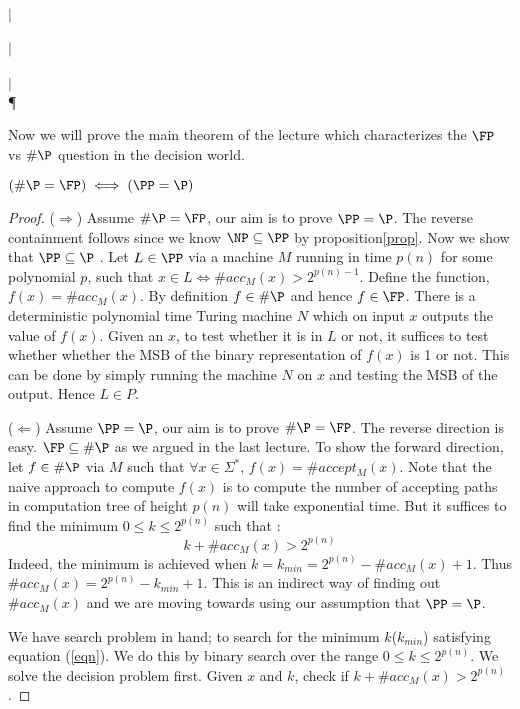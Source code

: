 \begin{center}
\PSPACE \\ 
$\vert$ \\
\PP \\
$\vert$ \\
\NP \\
$\vert$ \\
\P
\end{center}

Now we will prove the main theorem of the lecture which characterizes the $\FP$ vs $\#\P$ question in the decision world.

\begin{theorem}
 $(\#\P = \FP) \iff (\PP = \P)$
\end{theorem}
\begin{proof}
($\Rightarrow$) Assume $\#\P = \FP$, our aim is to prove $\PP = \P$. The reverse containment follows since we know $\NP \subseteq \PP$ by proposition\ref{prop}. Now we show that $\PP \subseteq \P$ . Let $L \in \PP$
via a machine $M$ running in time $p(n)$ for some polynomial $p$, such that $x \in L \iff \#acc_M(x) > 2^{p(n)-1}$.
Define the function, $f(x) = \#acc_M(x)$. By definition $f \in \#\P$ and hence $f \in \FP$. There is a deterministic polynomial time Turing machine $N$ which on input $x$ outputs the value of $f(x)$. Given an $x$, to test whether it is in $L$ or not, it suffices to test whether whether the MSB of the binary representation of $f(x)$ is 1 or not. This can be done by simply running the machine $N$ on $x$ and testing the MSB of the output. Hence $L \in P$.

($\Leftarrow$) Assume $\PP = \P$, our aim is to prove $\#\P = \FP$. The reverse direction is easy. $\FP \subseteq \#\P$ as we argued in the last lecture. To show the forward direction, let $f\in \#\P$ via $M$ such that $\forall x \in \Sigma^*$, $f(x)=\# accept_M(x)$. Note that the naive approach to compute $f(x)$ is to compute the number of accepting paths in computation tree of height $p(n)$ will take exponential time. But it suffices to find the minimum $0 \le k \le 2^{p(n)}$ such that :
\begin{equation}
\label{eqn}
k+\#acc_M(x) > 2^{p(n)}
\end{equation}
Indeed, the minimum is achieved when $k = k_{min} = 2^{p(n)} - \#acc_M(x) + 1$. Thus $\#acc_M(x) = 2^{p(n)} - k_{min} +1$. This is an indirect way of finding out $\#acc_M(x)$ and we are moving towards using our assumption that $\PP = \P$.

We have  search problem in hand; to search for the minimum $k$($k_{min}$) satisfying equation (\ref{eqn}). We do this by binary search over the range $0 \le k \le 2^{p(n)}$. We solve the decision problem first. {\sf Given $x$ and $k$, check if $k+\#acc_M(x) > 2^{p(n)}$}.


\end{proof}
